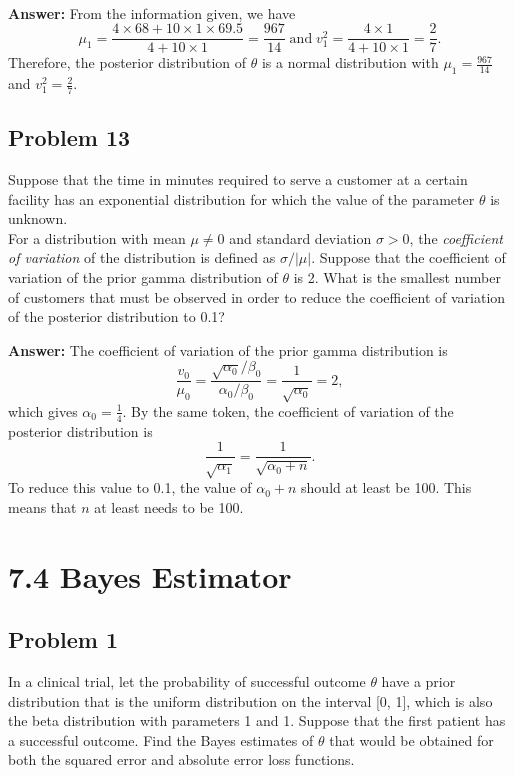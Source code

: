 \documentclass{article}
\begin{document}
\

\textbf{Answer:} From the information given, we have 
\begin{equation*}
\mu_1 = \frac{4 \times 68 + 10 \times 1 \times 69.5}{4 + 10 \times 1} = \frac{967}{14} \; \text{and} \;
v_1^2 = \frac{4 \times 1}{4 + 10 \times 1} = \frac{2}{7}.
\end{equation*}
Therefore, the posterior distribution of $\theta$ is a normal distribution with $\mu_1 = \frac{967}{14}$ and $v_1^2 = \frac{2}{7}$.

\bigskip

\subsection*{Problem 13}
Suppose that the time in minutes required to serve a customer at a certain facility has an exponential distribution for which the value of the parameter $\theta$ is unknown.\\
For a distribution with mean $\mu \ne 0$ and standard deviation $\sigma > 0$, the \textit{coefficient of variation} of the distribution is defined as $\sigma/|\mu|$. Suppose that the coefficient of variation of the prior gamma distribution of $\theta$ is 2. What is the smallest number of customers that must be observed in order to reduce the coefficient of variation of the posterior distribution to 0.1?

\textbf{Answer:} The coefficient of variation of the prior gamma distribution is
\begin{equation*}
\frac{v_0}{\mu_0} = \frac{\sqrt{\alpha_0}/\beta_0}{\alpha_0/\beta_0} = \frac{1}{\sqrt{\alpha_0}} = 2,
\end{equation*}
which gives $\alpha_0 = \frac{1}{4}$. By the same token, the coefficient of variation of the posterior distribution is 
\begin{equation*}
\frac{1}{\sqrt{\alpha_1}} = \frac{1}{\sqrt{\alpha_0 + n}}.
\end{equation*}
To reduce this value to 0.1, the value of $\alpha_0 + n$ should at least be 100. This means that $n$ at least needs to be 100.

\newpage

\section*{7.4 Bayes Estimator}
\subsection*{Problem 1}
In a clinical trial, let the probability of successful outcome $\theta$ have a prior distribution that is the uniform distribution on the interval [0, 1], which is also the beta distribution with parameters 1 and 1. Suppose that the first patient has a successful outcome. Find the Bayes estimates of $\theta$ that would be obtained for both the squared error and absolute error loss functions.
\end{document}
